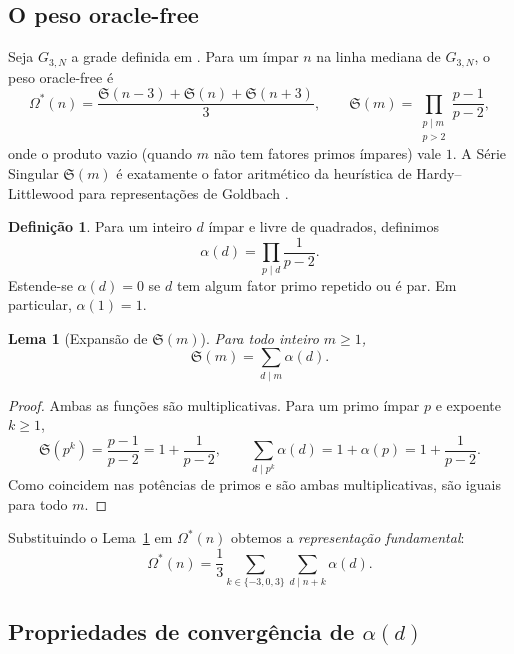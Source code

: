 \documentclass[12pt]{article}
\newtheorem{lema}[teorema]{Lema}
\theoremstyle{definition}
\newtheorem{definicao}[teorema]{Definição}
\theoremstyle{remark}
\newcommand{\Ss}{\mathfrak{S}}
\newcommand{\Omstar}{\Omega^*}
\begin{document}
	\subsection{O peso oracle-free}
	
	Seja $G_{3,N}$ a grade definida em \cite{bandeira1}.
	Para um ímpar $n$ na linha mediana de $G_{3,N}$, o peso oracle-free é
	\[
	\Omstar(n)
	=\frac{\Ss(n-3)+\Ss(n)+\Ss(n+3)}{3},
	\qquad
	\Ss(m)=\prod_{\substack{p\mid m\\ p>2}}\frac{p-1}{p-2},
	\]
	onde o produto vazio (quando $m$ não tem fatores primos ímpares) vale $1$.
	A Série Singular $\Ss(m)$ é exatamente o fator aritmético da heurística
	de Hardy–Littlewood para representações de Goldbach \cite{hardylittlewood}.
	
	\begin{definicao}
		Para um inteiro $d$ ímpar e livre de quadrados, definimos
		\[
		\alpha(d)=\prod_{p\mid d}\frac{1}{p-2}.
		\]
		Estende-se $\alpha(d)=0$ se $d$ tem algum fator primo repetido ou é par.
		Em particular, $\alpha(1)=1$.
	\end{definicao}
	
	\begin{lema}[Expansão de $\Ss(m)$]\label{lem:expansao}
		Para todo inteiro $m\ge1$,
		\[
		\Ss(m)=\sum_{d\mid m}\alpha(d).
		\]
	\end{lema}
	\begin{proof}
		Ambas as funções são multiplicativas. Para um primo ímpar $p$ e
		expoente $k\ge1$,
		\[
		\Ss(p^k)=\frac{p-1}{p-2}=1+\frac{1}{p-2},
		\qquad
		\sum_{d\mid p^k}\alpha(d)=1+\alpha(p)=1+\frac{1}{p-2}.
		\]
		Como coincidem nas potências de primos e são ambas multiplicativas,
		são iguais para todo $m$.
	\end{proof}
	
	Substituindo o Lema~\ref{lem:expansao} em $\Omstar(n)$ obtemos a
	\emph{representação fundamental}:
	\[
	\Omstar(n)=\frac{1}{3}\sum_{k\in\{-3,0,3\}}\sum_{d\mid n+k}\alpha(d).
	\]
	
	\subsection{Propriedades de convergência de $\alpha(d)$}
	
\end{document}
